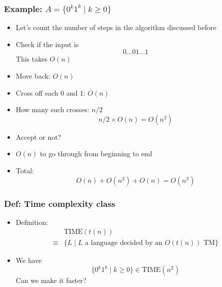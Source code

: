 



\begin{frame}[allowframebreaks] \frametitle{Example: $A=\{0^k 1^k\mid k \geq 0\}$}
\begin{itemize}
\item Let's count the number of steps in the algorithm
  discussed before
  
\item Check if the input is
  \begin{equation*}
0...0 1...1
\end{equation*}
This takes $O(n)$
\item Move back: $O(n)$
\item Cross off each 0 and 1: $O(n)$

\item [] How many such crosses: $n/2$
  \begin{equation*}
n/2 \times O(n) = O(n^2)
\end{equation*}
\item Accept or not?

\item [] $O(n)$ to go through from beginning to end
\item Total:
  \begin{equation*}
O(n) + O(n^2) +O(n) = O(n^2)
\end{equation*}
\end{itemize}\end{frame} \begin{frame}[allowframebreaks] \frametitle{Def: Time complexity class}
  \begin{itemize}
  \item Definition:
    \begin{equation*}
      \begin{split}
& \text{TIME}(t(n))\\
\equiv
& \{ L\mid L \text{ a language decided by an $O(t(n))$ TM}
\}
\end{split}
\end{equation*}
\item We have
  \begin{equation*}
  \{0^k 1^k \mid k \geq 0\} \in \text{TIME}(n^2)
\end{equation*}
Can we make it faster?


\end{itemize}
\end{frame}
